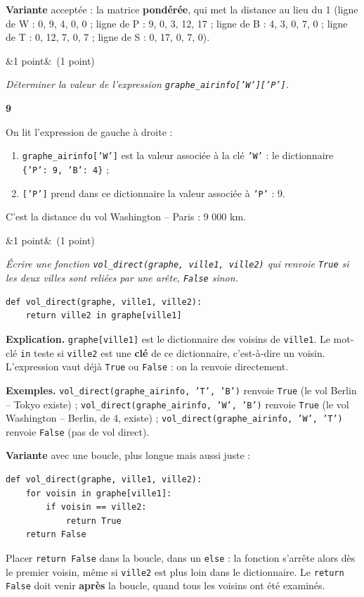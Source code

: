 \documentclass[11pt, a4paper]{exam}
\newcommand{\code}[1]{\texttt{#1}}
\newcommand{\Q}[3]{\par\needspace{5\baselineskip}\bigskip\noindent{\large\bfseries Question #1}\ifx&#2&\else\ \textnormal{(#2)}\fi\par\nopagebreak\smallskip\noindent\textit{#3}\par\nopagebreak\smallskip}
\begin{document}
\textbf{Variante} acceptée : la matrice \textbf{pondérée}, qui met la distance au lieu du 1 (ligne de W : 0, 9, 4, 0, 0 ; ligne de P : 9, 0, 3, 12, 17 ; ligne de B : 4, 3, 0, 7, 0 ; ligne de T : 0, 12, 7, 0, 7 ; ligne de S : 0, 17, 0, 7, 0).

\Q{10}{1 point}{Déterminer la valeur de l'expression \code{graphe\_airinfo['W']['P']}.}
\begin{reponse}
\textbf{9}
\end{reponse}
On lit l'expression de gauche à droite :
\begin{enumerate}
\item \code{graphe\_airinfo['W']} est la valeur associée à la clé \code{'W'} : le dictionnaire \code{\{'P': 9, 'B': 4\}} ;
\item \code{['P']} prend dans ce dictionnaire la valeur associée à \code{'P'} : 9.
\end{enumerate}
C'est la distance du vol Washington -- Paris : 9 000 km.

\Q{11}{1 point}{Écrire une fonction \code{vol\_direct(graphe, ville1, ville2)} qui renvoie \code{True} si les deux villes sont reliées par une arête, \code{False} sinon.}
\begin{reponse}
\begin{lstlisting}
def vol_direct(graphe, ville1, ville2):
    return ville2 in graphe[ville1]
\end{lstlisting}
\end{reponse}
\textbf{Explication.} \code{graphe[ville1]} est le dictionnaire des voisins de \code{ville1}. Le mot-clé \code{in} teste si \code{ville2} est une \textbf{clé} de ce dictionnaire, c'est-à-dire un voisin. L'expression vaut déjà \code{True} ou \code{False} : on la renvoie directement.

\textbf{Exemples.} \code{vol\_direct(graphe\_airinfo, 'T', 'B')} renvoie \code{True} (le vol Berlin -- Tokyo existe) ; \code{vol\_direct(graphe\_airinfo, 'W', 'B')} renvoie \code{True} (le vol Washington -- Berlin, de 4, existe) ; \code{vol\_direct(graphe\_airinfo, 'W', 'T')} renvoie \code{False} (pas de vol direct).

\textbf{Variante} avec une boucle, plus longue mais aussi juste :
\begin{lstlisting}
def vol_direct(graphe, ville1, ville2):
    for voisin in graphe[ville1]:
        if voisin == ville2:
            return True
    return False
\end{lstlisting}
\begin{erreur}
Placer \code{return False} dans la boucle, dans un \code{else} : la fonction s'arrête alors dès le premier voisin, même si \code{ville2} est plus loin dans le dictionnaire. Le \code{return False} doit venir \textbf{après} la boucle, quand tous les voisins ont été examinés.
\end{erreur}
\end{document}

